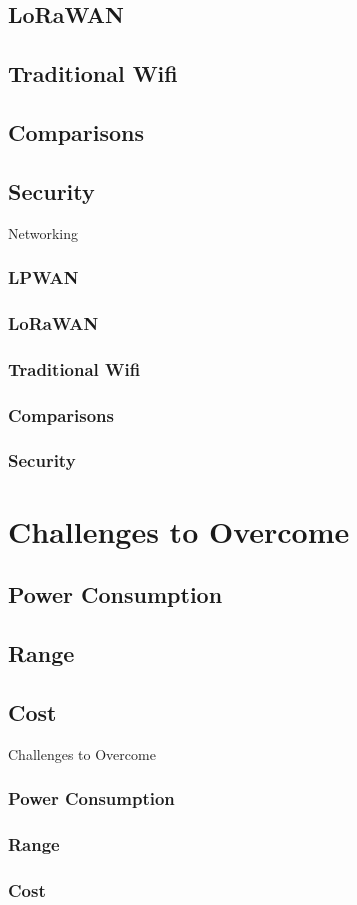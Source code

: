 \documentclass{beamer}
\begin{document}
\subsection{LoRaWAN}
\subsection{Traditional Wifi}
\subsection{Comparisons}
\subsection{Security}

\begin{frame}{Networking}
  \frametitle{LPWAN}
  \frametitle{LoRaWAN}
  \frametitle{Traditional Wifi}
  \frametitle{Comparisons}
  \frametitle{Security}
\end{frame}

\section{Challenges to Overcome}
\subsection{Power Consumption}
\subsection{Range}
\subsection{Cost}

\begin{frame}{Challenges to Overcome}
  \frametitle{Power Consumption}
  \frametitle{Range}
  \frametitle{Cost}
\end{frame}
\end{document}
